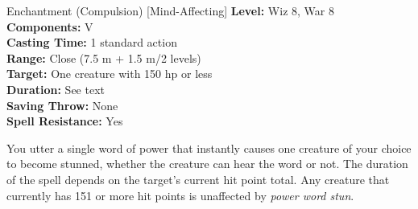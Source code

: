 {Enchantment (Compulsion) [Mind-Affecting]}
{
	\textbf{Level:}
	Wiz 8, War 8\\
	\textbf{Components:}
	V\\
	\textbf{Casting Time:}
	1 standard action\\
	\textbf{Range:}
	Close (7.5 m + 1.5 m/2 levels)\\
	\textbf{Target:}
	One creature with 150 hp or less\\
	\textbf{Duration:}
	See text\\
	\textbf{Saving Throw:}
	None\\
	\textbf{Spell Resistance:}
	Yes\\
}
{

	You utter a single word of power that instantly causes one creature of your choice to become stunned, whether the creature can hear the word or not. The duration of the spell depends on the target's current hit point total. Any creature that currently has 151 or more hit points is unaffected by \emph{power word stun}.

}
